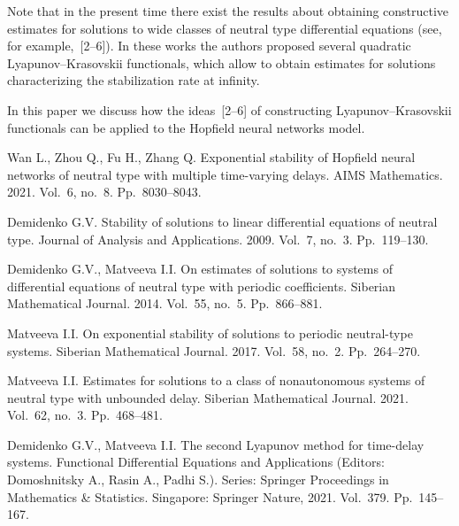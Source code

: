 \documentclass[12pt]{llncs}
\begin{document}
Note that in the present time there exist the results about obtaining constructive estimates for solutions to wide classes of neutral type differential equations (see, for example,~[2--6]).
In these works the authors proposed several quadratic Lyapunov--Krasovskii functionals, which allow to obtain estimates for solutions characterizing the stabilization rate at infinity.

In this paper we discuss how the ideas~[2--6] of constructing Lyapunov--Krasovskii functionals can be applied to the Hopfield neural networks model.



\begin{thebibliography}{9} %

Wan L., Zhou Q., Fu H., Zhang Q.
Exponential stability of Hopfield neural networks of neutral type
with multiple time-varying delays.
AIMS Mathematics.
2021. Vol.~6, no.~8. Pp.~8030--8043.

Demidenko G.V.
Stability of solutions to linear differential equations of neutral type.
Journal of Analysis and Applications.
2009. Vol.~7, no.~3. Pp.~119--130.

Demidenko G.V., Matveeva I.I.
On estimates of solutions to systems of differential equations of neutral
type with periodic coefficients.
Siberian Mathematical Journal.
2014. Vol.~55, no.~5. Pp.~866--881.

Matveeva I.I.
On exponential stability of solutions to periodic neutral-type systems.
Siberian Mathematical Journal.
2017. Vol.~58, no.~2. Pp.~264--270.

Matveeva I.I.
Estimates for solutions to a class of nonautonomous systems
of neutral type with unbounded delay.
Siberian Mathematical Journal.
2021. Vol.~62, no.~3. Pp.~468--481.

Demidenko G.V., Matveeva I.I.
The second Lyapunov method for time-delay systems.
Functional Differential Equations and Applications
(Editors: Domoshnitsky A., Rasin A., Padhi S.).
Series: Springer Proceedings in Mathematics \& Statistics.
Singapore: Springer Nature, 2021. Vol.~379. Pp.~145--167.

\end{thebibliography}

\end{document}
